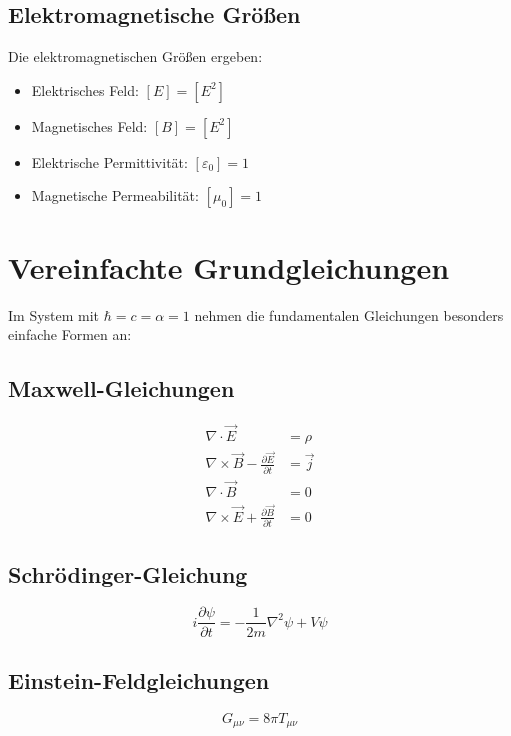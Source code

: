 \documentclass{article}
\begin{document}
	\subsection{Elektromagnetische Größen}
	
	Die elektromagnetischen Größen ergeben:
	
	\begin{itemize}
		\item Elektrisches Feld: $[E] = [E^2]$ 
		\item Magnetisches Feld: $[B] = [E^2]$
		\item Elektrische Permittivität: $[\varepsilon_0] = 1$ 
		\item Magnetische Permeabilität: $[\mu_0] = 1$
	\end{itemize}
	
	\section{Vereinfachte Grundgleichungen}
	
	Im System mit $\hbar = c = \alpha = 1$ nehmen die fundamentalen Gleichungen besonders einfache Formen an:
	
	\subsection{Maxwell-Gleichungen}
	\begin{align}
		\nabla \cdot \vec{E} &= \rho \\
		\nabla \times \vec{B} - \frac{\partial \vec{E}}{\partial t} &= \vec{j} \\
		\nabla \cdot \vec{B} &= 0 \\
		\nabla \times \vec{E} + \frac{\partial \vec{B}}{\partial t} &= 0
	\end{align}
	
	\subsection{Schrödinger-Gleichung}
	\begin{equation}
		i\frac{\partial \psi}{\partial t} = -\frac{1}{2m}\nabla^2\psi + V\psi
	\end{equation}
	
	\subsection{Einstein-Feldgleichungen}
	\begin{equation}
		G_{\mu\nu} = 8\pi T_{\mu\nu}
	\end{equation}
	
\end{document}

